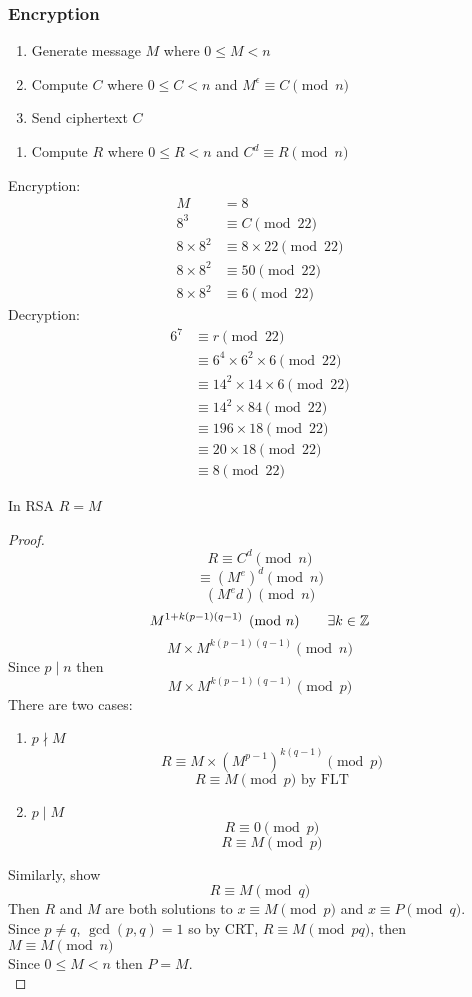 \documentclass[english, 12pt]{article}
\begin{document}
\subsubsection*{Encryption}
\begin{enumerate}
\item Generate message $M$ where $ 0 \leq M < n$
\item Compute $C$ where $ 0 \leq C < n$ and $M^\epsilon \equiv C \pmod n$
\item Send ciphertext $C$
\end{enumerate}
\begin{enumerate}
\item Compute $R$ where $0 \leq R < n$ and $C^d \equiv R \pmod n$
\end{enumerate}
\begin{exmp}
Encryption:
\begin{align*}
M &= 8 \\
8^3 &\equiv C \pmod {22} \\
8\times 8 ^2 &\equiv 8\times 22 \pmod {22} \\
8\times 8 ^2  &\equiv 50 \pmod {22} \\
8\times 8 ^2  &\equiv 6 \pmod {22} 
\end{align*}
Decryption:
\begin{align*}
6^7 &\equiv r \pmod{22} \\
&\equiv 6^4 \times 6^2 \times 6 \pmod{22}\\
&\equiv 14^2 \times 14 \times 6 \pmod{22} \\
&\equiv 14^2 \times 84 \pmod{22} \\
&\equiv 196 \times 18 \pmod{22} \\
&\equiv 20 \times 18 \pmod{22} \\
&\equiv 8 \pmod{22} 
\end{align*}
\end{exmp}
\begin{thrm}[RSA]
In RSA $R = M$
\begin{proof}
\[R \equiv C^d \pmod n \]
\[\equiv (M^e)^d \pmod n \]
\[ (M^ed) \pmod n \]
\[M^{1+k(p-1)(q-1)} \pmod n \qquad \exists k \in {\mathbb{Z}}\]
\[M\times M^{k(p-1)(q-1)} \pmod n \]
Since $p \mid n$ then
\[M\times M^{k(p-1)(q-1)} \pmod p \]
There are two cases:
\begin{enumerate}
\item $p \nmid M$
\[R \equiv M\times (M^{p-1})^{k(q-1)} \pmod p\]
\[ R \equiv M \pmod p \text{ by FLT}\]
\item $p \mid M$
\[ R \equiv 0 \pmod p \]
\[R \equiv M \pmod p \]
\end{enumerate}
Similarly, show 
\[R \equiv M \pmod q \]
Then $R$ and $M$ are both solutions to $x \equiv M \pmod p$ and $x \equiv P \pmod q$.\\
Since $p \neq q$, $\gcd(p,q) = 1$ so by CRT, $R \equiv M \pmod{pq}$, then $M \equiv M \pmod{n}$\\
Since $0 \leq M < n$ then $P = M$.\\
\end{proof}
\end{thrm}
\end{document}
